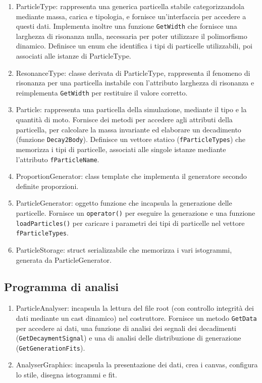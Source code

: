 \documentclass[12pt, a4paper]{article}
\begin{document}
\begin{enumerate}
\item ParticleType: rappresenta una generica particella stabile categorizzandola mediante massa, carica e tipologia, e fornisce un'interfaccia per accedere a questi dati. Implementa inoltre una funzione \verb!GetWidth! che fornisce una larghezza di risonanza nulla, necessaria per poter utilizzare il polimorfismo dinamico. 
Definisce un enum che identifica i tipi di particelle utilizzabili, poi associati alle istanze di ParticleType.

\item ResonanceType: classe derivata di ParticleType, rappresenta il fenomeno di risonanza per una particella instabile con l'attributo larghezza di risonanza e reimplementa \verb!GetWidth! per restituire il valore corretto. 

\item Particle: rappresenta una particella della simulazione, mediante il tipo e la quantità di moto. 
Fornisce dei metodi per accedere agli attributi della particella, per calcolare la massa invariante ed elaborare un decadimento (funzione \verb!Decay2Body!).
Definisce un vettore statico (\verb!fParticleTypes!) che memorizza i tipi di particelle, associati alle singole istanze mediante l'attributo \verb!fParticleName!.

\item ProportionGenerator: class template che implementa il generatore secondo definite proporzioni. 
\item ParticleGenerator: oggetto funzione che incapsula la generazione delle particelle. 
Fornisce un \verb!operator()! per eseguire la generazione e una funzione \verb!loadParticles()! per caricare i parametri dei tipi di particelle nel vettore \verb!fParticleTypes!.

\item ParticleStorage: struct serializzabile che memorizza i vari istogrammi, generata da ParticleGenerator. 

\end{enumerate}

\subsection{Programma di analisi}

\begin{enumerate}
\item ParticleAnalyser: incapsula la lettura del file root (con controllo integrità dei dati mediante un cast dinamico) nel costruttore. Fornisce un metodo \verb!GetData! per accedere ai dati, una funzione di analisi dei segnali dei decadimenti (\verb!GetDecaymentSignal!) e una di analisi delle distribuzione di generazione (\verb!GetGenerationFits!). 

\item AnalyserGraphics: incapsula la presentazione dei dati, crea i canvas, configura lo stile, disegna istogrammi e fit.


\end{enumerate}
\end{document}
